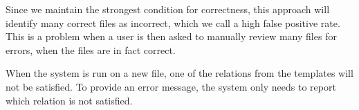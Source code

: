 Since we maintain the strongest condition for correctness, this approach will identify many correct files as incorrect, which we call a high false positive rate.
This is a problem when a user is then asked to manually review many files for errors, when the files are in fact correct.

When the system is run on a new file, one of the relations from the templates will not be satisfied.
To provide an error message, the system only needs to report which relation is not satisfied.

